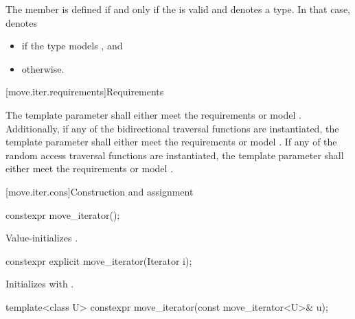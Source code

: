 \pnum
The member   is defined
if and only if the 
is valid and denotes a type.
In that case,  denotes
\begin{itemize}
\item
{} if
the type
 models
, and
\item
{} otherwise.
\end{itemize}

[move.iter.requirements]{Requirements}

\pnum
The template parameter  shall either
meet the  requirements
or model .
Additionally, if any of the bidirectional traversal
functions are instantiated, the template parameter shall either
meet the  requirements
or model .
If any of the random access traversal functions are instantiated, the
template parameter shall either
meet the  requirements
or model
.

[move.iter.cons]{Construction and assignment}

%
\begin{itemdecl}
constexpr move_iterator();
\end{itemdecl}

\begin{itemdescr}
\pnum
\effects
Value-initializes .
\end{itemdescr}


%
\begin{itemdecl}
constexpr explicit move_iterator(Iterator i);
\end{itemdecl}

\begin{itemdescr}
\pnum
\effects
Initializes  with .
\end{itemdescr}


%
\begin{itemdecl}
template<class U> constexpr move_iterator(const move_iterator<U>& u);
\end{itemdecl}

